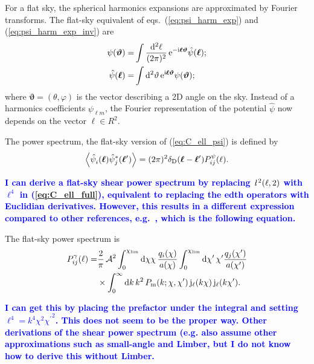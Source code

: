 \documentclass[fleqn,usenatbib]{mnras} %
\newcommand{\ellbar}{\hbox{\it \l}\,}
\newcommand{\pref}{{\cal A}}
\renewcommand{\vec}{\bm}
\newcommand{\mk}[1]{{\bf\textcolor{blue}{#1}}}
\begin{document}
For a flat sky, the spherical harmonics expansions are approximated by Fourier
transforms. The flat-sky equivalent of eqs.~(\ref{eq:psi_harm_exp}) and
(\ref{eq:psi_harm_exp_inv}) are
%
\begin{align}
  \psi(\vec \vartheta) = & \int \frac{{\rm d}^2 \ell}{(2\pi)^2} \, {\rm e}^{-{\rm i} \vec \ell \vec \vartheta} \hat \psi(\vec \ell);
  \label{eq:psi_fourier}
  \\
  \hat \psi(\vec \ell) = & \int {\rm d}^2 \vartheta \, {\rm e}^{{\rm i} \vec \ell \vec \vartheta} \psi(\vec \vartheta);
  \label{eq:psi_fourier_inv}
\end{align}
%
where $\vec \vartheta = (\theta, \varphi)$ is the vector describing a 2D angle on the sky.
Instead of a harmonics coefficients $\psi_{\ell m}$, the Fourier representation of the potential
$\hat \psi$ now depends on the vector $\vec \ell \in R^2$.

The power spectrum, the flat-sky version of
(\ref{eq:C_ell_psi}) is defined by
%
\begin{equation}
  \left\langle \hat \psi_i^{}(\vec \ell) \hat \psi_j^\ast(\vec \ell^\prime) \right\rangle
    = (2\pi)^2 \delta_{\rm D}(\vec \ell - \vec \ell^\prime) P^\psi_{ij}(\ell).
  \label{eq:P_ell_psi}
\end{equation}


\mk{I can derive a flat-sky shear power spectrum by replacing $\ellbar^2(\ell, 2)$ with $\ell^4$
in (\ref{eq:C_ell_full}), equivalent to replacing the edth operators with Euclidian derivatives.
However, this results in a different expression compared to other references, e.g.~\cite{2008PhRvD..78d3002S},
which is the following equation.}

The flat-sky power spectrum is
%
\begin{align}
  P_{ij}^\gamma(\ell) = & \frac 2 \pi \, \pref^2
                 \int_{0}^{\chi_{\rm lim}} {\rm d} \chi \chi \, \frac{q_i(\chi)}{a(\chi)}
                \int_{0}^{\chi_{\rm lim}} {\rm d} \chi^\prime\, \chi^\prime
                \frac{q_j(\chi^\prime)}{a(\chi^\prime)}
                \nonumber \\
                & \times \int_0^\infty {\rm d} k \, k^2 \, P_{\rm m}(k; \chi, \chi^\prime) \,
                {\rm j}_\ell(k \chi) \, {\rm j}_\ell(k \chi^\prime) .
  \label{eq:P_ell_gamma}
\end{align}
%

\mk{I can get this by placing the prefactor under the integral and
setting $\ell^4 = k^4 \chi^2 {\chi^\prime}^2$. This does not seem to be the proper way.
Other derivations of the shear power spectrum (e.g.\cite{BS01} also assume other approximations
such as small-angle and Limber, but I do not know how to derive this without Limber.}
\end{document}
